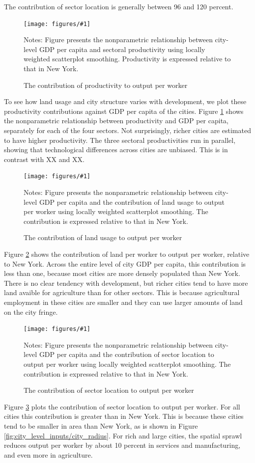 \documentclass[12pt]{article}
\newcommand{\dofigure}[3]{\begin{figure}
\begin{centering}
\texttt{[image: figures/\#1]}
  \caption{#2\label{fig:#1}}
\end{centering}

\noindent \footnotesize{#3}
\end{figure}}
\begin{document}
The contribution of sector location is generally between 96 and 120 percent.

\dofigure{city_level_inputs/productivity}{The contribution of productivity to output per worker}{Notes: Figure presents the nonparametric relationship between city-level GDP per capita and sectoral productivity using locally weighted scatterplot smoothing. Productivity is expressed relative to that in New York.}

To see how land usage and city structure varies with development, we plot these productivity contributions against GDP per capita of the cities. Figure \ref{fig:city_level_inputs/productivity} shows the nonparametric relationship between productivity and GDP per capita, separately for each of the four sectors. Not surprisingly, richer cities are estimated to have higher productivity. The three sectoral productivities run in parallel, showing that technological differences across cities are unbiased. This is in contrast with XX and XX.

\dofigure{city_level_inputs/land}{The contribution of land usage to output per worker}{Notes: Figure presents the nonparametric relationship between city-level GDP per capita and the contribution of land usage to output per worker using locally weighted scatterplot smoothing. The contribution is expressed relative to that in New York.}

Figure \ref{fig:city_level_inputs/land} shows the contribution of land per worker to output per worker, relative to New York. Across the entire level of city GDP per capita, this contribution is less than one, because most cities are more densely populated than New York. There is no clear tendency with development, but richer cities tend to have more land avaible for agriculture than for other sectors. This is because agricultural employment in these cities are smaller and they can use larger amounts of land on the city fringe.

\dofigure{city_level_inputs/location}{The contribution of sector location to output per worker}{Notes: Figure presents the nonparametric relationship between city-level GDP per capita and the contribution of sector location to output per worker using locally weighted scatterplot smoothing. The contribution is expressed relative to that in New York.}

Figure \ref{fig:city_level_inputs/location} plots the contribution of sector location to output per worker. For all cities this contribution is greater than in New York. This is because these cities tend to be smaller in area than New York, as is shown in Figure \ref{fig:city_level_inputs/city_radius}. For rich and large cities, the spatial sprawl reduces output per worker by about 10 percent in services and manufacturing, and even more in agriculture.
\end{document}
